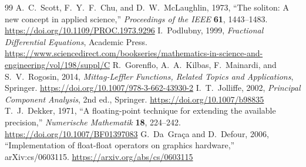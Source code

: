 \begin{thebibliography}{99}
 A.~C.~Scott, F.~Y.~F.~Chu, and D.~W.~McLaughlin, 1973, ``The soliton: A new concept in applied science,'' \emph{Proceedings of the IEEE} \textbf{61}, 1443--1483. \url{https://doi.org/10.1109/PROC.1973.9296}
 I.~Podlubny, 1999, \emph{Fractional Differential Equations}, Academic Press. \url{https://www.sciencedirect.com/bookseries/mathematics-in-science-and-engineering/vol/198/suppl/C}
 R.~Gorenflo, A.~A.~Kilbas, F.~Mainardi, and S.~V.~Rogosin, 2014, \emph{Mittag-Leffler Functions, Related Topics and Applications}, Springer. \url{https://doi.org/10.1007/978-3-662-43930-2}
 I.~T.~Jolliffe, 2002, \emph{Principal Component Analysis}, 2nd ed., Springer. \url{https://doi.org/10.1007/b98835}
 T.~J.~Dekker, 1971, ``A floating-point technique for extending the available precision,'' \emph{Numerische Mathematik} \textbf{18}, 224--242. \url{https://doi.org/10.1007/BF01397083}
 G.~Da~Graça and D.~Defour, 2006, ``Implementation of float-float operators on graphics hardware,'' arXiv:cs/0603115. \url{https://arxiv.org/abs/cs/0603115}
\end{thebibliography}
